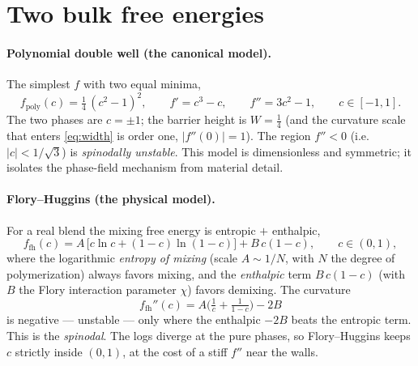 \section{Two bulk free energies}

\paragraph{Polynomial double well (the canonical model).}
The simplest $f$ with two equal minima,
%
\begin{equation}
  f_{\text{poly}}(c) = \tfrac14\,(c^2-1)^2,\qquad
  f'=c^3-c,\qquad f''=3c^2-1,\qquad c\in[-1,1].
\end{equation}
%
The two phases are $c=\pm1$; the barrier height is $W=\tfrac14$ (and the
curvature scale that enters \eqref{eq:width} is order one, $|f''(0)|=1$).
The region $f''<0$ (i.e. $|c|<1/\sqrt3$) is \emph{spinodally unstable}.
This model is dimensionless and symmetric; it isolates the phase-field
mechanism from material detail.

\paragraph{Flory--Huggins (the physical model).}
For a real blend the mixing free energy is entropic $+$ enthalpic,
%
\begin{equation}
  f_{\text{fh}}(c) = A\,\big[c\ln c + (1-c)\ln(1-c)\big] + B\,c(1-c),
  \qquad c\in(0,1),
  \label{eq:fh}
\end{equation}
%
where the logarithmic \emph{entropy of mixing} (scale $A\sim 1/N$, with
$N$ the degree of polymerization) always favors mixing, and the
\emph{enthalpic} term $B\,c(1-c)$ (with $B$ the Flory interaction
parameter $\chi$) favors demixing. The curvature
%
\begin{equation}
  f_{\text{fh}}''(c) = A\Big(\tfrac1c + \tfrac1{1-c}\Big) - 2B
\end{equation}
%
is negative --- unstable --- only where the enthalpic $-2B$ beats the
entropic term. This is the \emph{spinodal}. The logs diverge at the
pure phases, so Flory--Huggins keeps $c$ strictly inside $(0,1)$, at the
cost of a stiff $f''$ near the walls.

